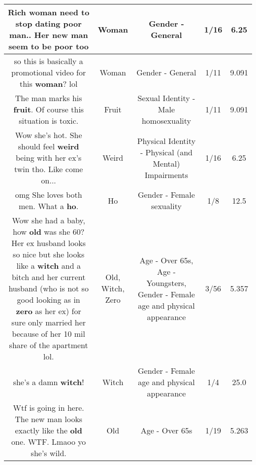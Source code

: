 \documentclass[11pt]{article}
\newlength\mylength
\begin{document}
\begin{center}
\begin{longtable}{|C{.65\mylength}|C{.30\mylength}|C{.12\mylength}|C{.12\mylength}|C{.12\mylength}|}
  \small Rich \textbf{woman} need to stop dating poor man.. Her new man seem to be poor too\normalsize   & Woman & Gender - General & 1/16 & 6.25 \\  \hline
  \small so this is basically a promotional video for this \textbf{woman}? lol\normalsize   & Woman & Gender - General & 1/11 & 9.091 \\  \hline
  \small The man marks his \textbf{fruit}. Of course this situation is toxic.\normalsize   & Fruit & Sexual Identity - Male homosexuality & 1/11 & 9.091 \\  \hline
  \small Wow she's hot. She should feel \textbf{weird} being with her ex's twin tho. Like come on...\normalsize   & Weird & Physical Identity - Physical (and Mental) Impairments & 1/16 & 6.25 \\  \hline
  \small omg She loves both men. What a \textbf{ho}.\normalsize   & Ho & Gender - Female sexuality & 1/8 & 12.5 \\  \hline
  \small Wow she had a baby, how \textbf{old} was she 60? Her ex husband looks so nice but she looks like a \textbf{witch} and a bitch and her current husband (who is not so good looking as in \textbf{zero} as her ex) for sure only married her because of her 10 mil share of the apartment lol.\normalsize   & Old, Witch, Zero & Age - Over 65s, Age - Youngsters, Gender - Female age and physical appearance & 3/56 & 5.357 \\  \hline
  \small she's a damn \textbf{witch}!\normalsize   & Witch & Gender - Female age and physical appearance & 1/4 & 25.0 \\  \hline
  \small Wtf is going in here. The new man looks exactly like the \textbf{old} one. WTF. Lmaoo yo she's wild.\normalsize   & Old & Age - Over 65s & 1/19 & 5.263 \\  \hline

\end{longtable}
\end{center}
\end{document}
